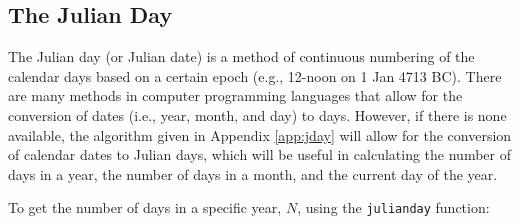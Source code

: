 \subsection{The Julian Day}
\label{sec:jday}
The Julian day (or Julian date) is a method of continuous numbering of the calendar days based on a certain epoch (e.g., 12-noon on 1 Jan 4713 BC). 
There are many methods in computer programming languages that allow for the conversion of dates (i.e., year, month, and day) to days. 
However, if there is none available, the algorithm given in Appendix \ref{app:jday} \parencite{meeus91} will allow for the conversion of calendar dates to Julian days, which will be useful in calculating the number of days in a year, the number of days in a month, and the current day of the year. 

To get the number of days in a specific year, $N$, using the \texttt{julian\textunderscore day} function:

